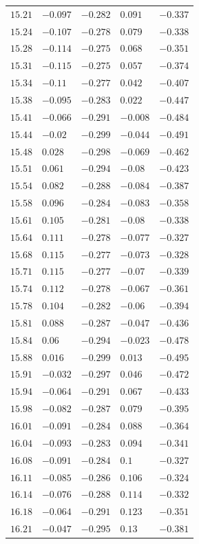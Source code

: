 \begin{center}
\begin{longtable}{lllll}
$15.21$&$-0.097$&$-0.282$&$0.091$&$-0.337$\\
$15.24$&$-0.107$&$-0.278$&$0.079$&$-0.338$\\
$15.28$&$-0.114$&$-0.275$&$0.068$&$-0.351$\\
$15.31$&$-0.115$&$-0.275$&$0.057$&$-0.374$\\
$15.34$&$-0.11$&$-0.277$&$0.042$&$-0.407$\\
$15.38$&$-0.095$&$-0.283$&$0.022$&$-0.447$\\
$15.41$&$-0.066$&$-0.291$&$-0.008$&$-0.484$\\
$15.44$&$-0.02$&$-0.299$&$-0.044$&$-0.491$\\
$15.48$&$0.028$&$-0.298$&$-0.069$&$-0.462$\\
$15.51$&$0.061$&$-0.294$&$-0.08$&$-0.423$\\
$15.54$&$0.082$&$-0.288$&$-0.084$&$-0.387$\\
$15.58$&$0.096$&$-0.284$&$-0.083$&$-0.358$\\
$15.61$&$0.105$&$-0.281$&$-0.08$&$-0.338$\\
$15.64$&$0.111$&$-0.278$&$-0.077$&$-0.327$\\
$15.68$&$0.115$&$-0.277$&$-0.073$&$-0.328$\\
$15.71$&$0.115$&$-0.277$&$-0.07$&$-0.339$\\
$15.74$&$0.112$&$-0.278$&$-0.067$&$-0.361$\\
$15.78$&$0.104$&$-0.282$&$-0.06$&$-0.394$\\
$15.81$&$0.088$&$-0.287$&$-0.047$&$-0.436$\\
$15.84$&$0.06$&$-0.294$&$-0.023$&$-0.478$\\
$15.88$&$0.016$&$-0.299$&$0.013$&$-0.495$\\
$15.91$&$-0.032$&$-0.297$&$0.046$&$-0.472$\\
$15.94$&$-0.064$&$-0.291$&$0.067$&$-0.433$\\
$15.98$&$-0.082$&$-0.287$&$0.079$&$-0.395$\\
$16.01$&$-0.091$&$-0.284$&$0.088$&$-0.364$\\
$16.04$&$-0.093$&$-0.283$&$0.094$&$-0.341$\\
$16.08$&$-0.091$&$-0.284$&$0.1$&$-0.327$\\
$16.11$&$-0.085$&$-0.286$&$0.106$&$-0.324$\\
$16.14$&$-0.076$&$-0.288$&$0.114$&$-0.332$\\
$16.18$&$-0.064$&$-0.291$&$0.123$&$-0.351$\\
$16.21$&$-0.047$&$-0.295$&$0.13$&$-0.381$\\

\end{longtable}
\end{center}
